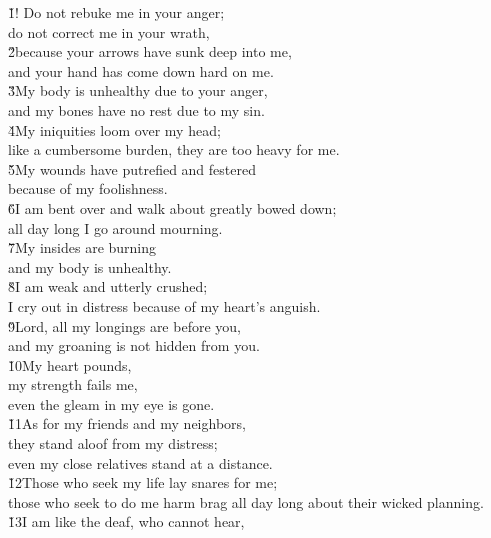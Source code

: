 \begin{poetry}
\poeml \v{1}! Do not rebuke me in your anger; \\
\poemll    do not correct me in your wrath, \\
\poeml \v{2}because your arrows have sunk deep into me, \\
\poemll    and your hand has come down hard on me. \\
\poeml \v{3}My body is unhealthy due to your anger, \\
\poemll    and my bones have no rest due to my sin. \\
\poeml \v{4}My iniquities loom over my head; \\
\poemll    like a cumbersome burden, they are too heavy for me. \\
\poeml \v{5}My wounds have putrefied and festered \\
\poemll    because of my foolishness. \\
\poeml \v{6}I am bent over and walk about greatly bowed down; \\
\poemll    all day long I go around mourning. \\
\poeml \v{7}My insides are burning \\
\poemll    and my body is unhealthy. \\
\poeml \v{8}I am weak and utterly crushed; \\
\poemll    I cry out in distress because of my heart's anguish. \\
\poeml \v{9}Lord, all my longings are before you, \\
\poemll    and my groaning is not hidden from you. \\
\poeml \v{10}My heart pounds, \\
\poemll    my strength fails me, \\
\poemlll       even the gleam in my eye is gone. \\
\poeml \v{11}As for my friends and my neighbors, \\
\poemll    they stand aloof from my distress; \\
\poemlll       even my close relatives stand at a distance. \\
\poeml \v{12}Those who seek my life lay snares for me; \\
\poemll    those who seek to do me harm brag all day long about their wicked planning. \\
\poeml \v{13}I am like the deaf, who cannot hear, \\

\end{poetry}
